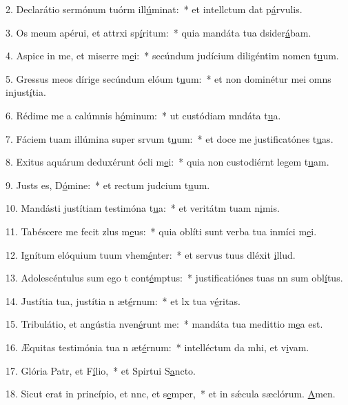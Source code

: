 2. Declarátio sermónum tuórm ill\uline{ú}minat:~* et intellctum dat p\uline{á}rvulis.\par 
3. Os meum apérui, et attrxi sp\uline{í}ritum:~* quia mandáta tua dsider\uline{á}bam.\par 
4. Aspice in me, et miserre m\uline{e}i:~* secúndum judícium diligéntim nomen t\uline{u}um.\par 
5. Gressus meos dírige secúndum elóum t\uline{u}um:~* et non dominétur mei omns injust\uline{í}tia.\par 
6. Rédime me a calúmnis h\uline{ó}minum:~* ut custódiam mndáta t\uline{u}a.\par 
7. Fáciem tuam illúmina super srvum t\uline{u}um:~* et doce me justificatónes t\uline{u}as.\par 
8. Exitus aquárum deduxérunt ócli m\uline{e}i:~* quia non custodiérnt legem t\uline{u}am.\par 
9. Justs es, D\uline{ó}mine:~* et rectum judcium t\uline{u}um.\par 
10. Mandásti justítiam testimóna t\uline{u}a:~* et veritátm tuam n\uline{i}mis.\par 
11. Tabéscere me fecit zlus m\uline{e}us:~* quia oblíti sunt verba tua inmíci m\uline{e}i.\par 
12. Ignítum elóquium tuum vhem\uline{é}nter:~* et servus tuus dléxit \uline{i}llud.\par 
13. Adolescéntulus sum ego t cont\uline{é}mptus:~* justificatiónes tuas nn sum obl\uline{í}tus.\par 
14. Justítia tua, justítia n æt\uline{é}rnum:~* et lx tua v\uline{é}ritas.\par 
15. Tribulátio, et angústia nven\uline{é}runt me:~* mandáta tua medittio m\uline{e}a est.\par 
16. Æquitas testimónia tua n æt\uline{é}rnum:~* intelléctum da mhi, et v\uline{i}vam.\par 
17. Glória Patr, et F\uline{í}lio,~* et Spirtui S\uline{a}ncto.\par 
18. Sicut erat in princípio, et nnc, et s\uline{e}mper,~* et in sǽcula sæclórum. \uline{A}men.\par 

